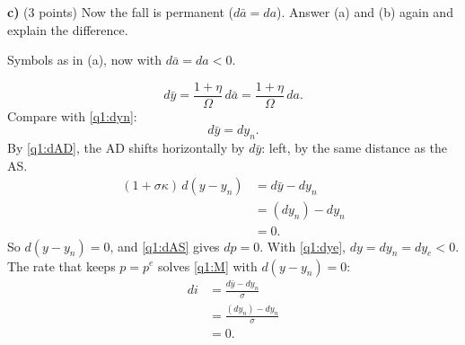 \textbf{c)} (3 points) Now the fall is permanent ($d\bar a=da$). Answer (a) and (b) again and explain the difference.
\resolespaco
\begin{sol}
\begin{notacao}
\item Symbols as in (a), now with $d\bar a=da<0$.
\end{notacao}
\begin{equation}
d\bar y=\frac{1+\eta}{\Omega}\,d\bar a=\frac{1+\eta}{\Omega}\,da . \nonumber
\end{equation}
Compare with \eqref{q1:dyn}:
\begin{equation}
d\bar y=dy_n . \label{q1:dybc}
\end{equation}
By \eqref{q1:dAD}, the AD shifts horizontally by $d\bar y$: left, by the same distance as the AS.
\begin{align}
(1+\sigma\kappa)\,d(y-y_n)&=d\bar y-dy_n\nonumber\\
&=(dy_n)-dy_n\nonumber\\
&=0 . \nonumber
\end{align}
So $d(y-y_n)=0$, and \eqref{q1:dAS} gives $dp=0$. With \eqref{q1:dye}, $dy=dy_n=dy_e<0$. The rate that keeps $p=p^e$ solves
\eqref{q1:M} with $d(y-y_n)=0$:
\begin{align}
di&=\frac{d\bar y-dy_n}{\sigma}\nonumber\\
&=\frac{(dy_n)-dy_n}{\sigma}\nonumber\\
&=0 . \nonumber
\end{align}
\end{sol}

